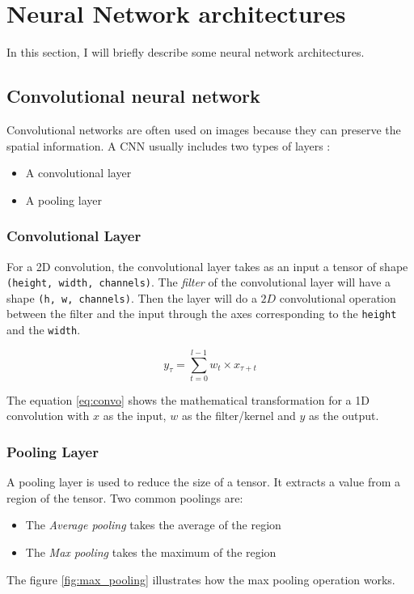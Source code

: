 \documentclass[12pt]{report}
\begin{document}

\section{Neural Network architectures}

In this section, I will briefly describe some neural network architectures.

\subsection{Convolutional neural network}

Convolutional networks are often used on images because they can preserve the spatial information.
A CNN usually includes two types of layers :
\begin{itemize}
    \item A convolutional layer
    \item A pooling layer
\end{itemize}

\subsubsection{Convolutional Layer}

For a 2D convolution, the convolutional layer takes as an input a tensor of shape \texttt{(height, width, channels)}.
The \textit{filter} of the convolutional layer will have a shape \texttt{(h, w, channels)}.
Then the layer will do a $2D$ convolutional operation between the filter and the input through the axes corresponding to the \texttt{height} and the \texttt{width}.

\begin{equation}
    y_{\tau} = \sum_{t=0}^{l-1} w_{t} \times x_{\tau + t}
    \label{eq:convo}
\end{equation}

The equation \ref{eq:convo} shows the mathematical transformation for a 1D convolution with $x$ as the input, $w$ as the filter/kernel and $y$ as the output.

\subsubsection{Pooling Layer}

A pooling layer is used to reduce the size of a tensor. It extracts a value from a region of the tensor. Two common poolings are:
\begin{itemize}
    \item The \textit{Average pooling} takes the average of the region
    \item The \textit{Max pooling} takes the maximum of the region
\end{itemize}
The figure \ref{fig:max_pooling} illustrates how the max pooling operation works.
\end{document}
